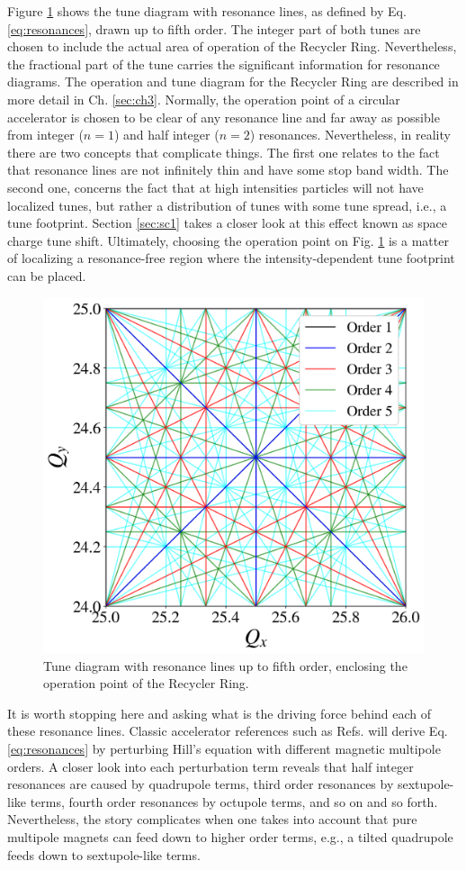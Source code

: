 Figure \ref{fig:tunediagram} shows the tune diagram with resonance lines, as defined by Eq. \ref{eq:resonances}, drawn up to fifth order. The integer part of both tunes are chosen to include the actual area of operation of the Recycler Ring. Nevertheless, the fractional part of the tune carries the significant information for resonance diagrams. The operation and tune diagram for the Recycler Ring are described in more detail in Ch. \ref{sec:ch3}. Normally, the operation point of a circular accelerator is chosen to be clear of any resonance line and far away as possible from integer ($n=1$) and half integer ($n=2$) resonances. Nevertheless, in reality there are two concepts that complicate things. The first one relates to the fact that resonance lines are not infinitely thin and have some stop band width. The second one, concerns the fact that at high intensities particles will not have localized tunes, but rather a distribution of tunes with some tune spread, i.e., a tune footprint. Section \ref{sec:sc1} takes a closer look at this effect known as space charge tune shift. Ultimately, choosing the operation point on Fig. \ref{fig:tunediagram} is a matter of localizing a resonance-free region where the intensity-dependent tune footprint can be placed.   
\begin{figure}[H]
    \centering
    \includegraphics[width=0.8\columnwidth]{chapter2/tunediagram.png}
    \caption{Tune diagram with resonance lines up to fifth order, enclosing the operation point of the Recycler Ring.}
    \label{fig:tunediagram}
 \end{figure}
It is worth stopping here and asking what is the driving force behind each of these resonance lines. Classic accelerator references such as Refs. \cite{wolski,Wiedemann2015,sylee} will derive Eq. \ref{eq:resonances} by perturbing Hill's equation with different magnetic multipole orders. A closer look into each perturbation term reveals that half integer resonances are caused by quadrupole terms, third order resonances by sextupole-like terms, fourth order resonances by octupole terms, and so on and so forth. Nevertheless, the story complicates when one takes into account that pure multipole magnets can feed down to higher order terms, e.g., a tilted quadrupole feeds down to sextupole-like terms.        

